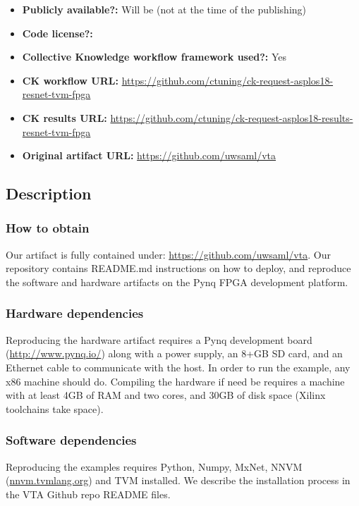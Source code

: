 \documentclass[sigconf]{acmart}
\begin{document}
\begin{itemize}
  \item {\bf Publicly available?:} Will be (not at the time of the publishing)
  \item {\bf Code license?:} 
  \item {\bf Collective Knowledge workflow framework used?:} Yes
  \item {\bf CK workflow URL:} \url{https://github.com/ctuning/ck-request-asplos18-resnet-tvm-fpga}
  \item {\bf CK results URL:} \url{https://github.com/ctuning/ck-request-asplos18-results-resnet-tvm-fpga}
  \item {\bf Original artifact URL:} \url{https://github.com/uwsaml/vta}
\end{itemize}

\subsection{Description}

\subsubsection{How to obtain}

Our artifact is fully contained under: \url{https://github.com/uwsaml/vta}.
Our repository contains README.md instructions on how to deploy, and reproduce the software and hardware artifacts on the Pynq FPGA development platform.

\subsubsection{Hardware dependencies}

Reproducing the hardware artifact requires a Pynq development board (\url{http://www.pynq.io/}) along with a power supply, an 8+GB SD card, and an Ethernet cable to communicate with the host. In order to run the example, any x86 machine should do. Compiling the hardware if need be requires a machine with at least 4GB of RAM and two cores, and 30GB of disk space (Xilinx toolchains take space).

\subsubsection{Software dependencies}

Reproducing the examples requires Python, Numpy, MxNet, NNVM (\url{nnvm.tvmlang.org}) and TVM installed. We describe the installation process in the VTA Github repo README files.
\end{document}
